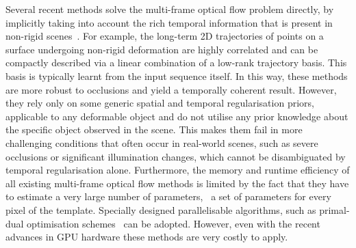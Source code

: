 Several recent methods solve the multi-frame optical flow problem directly, by 
implicitly taking into account the rich temporal information that is present in 
non-rigid scenes~\cite{irani2002multi,torresani2001tracking,torresani2002space,%
tomasi2012dense,ricco2013video,garg2013variational}. 
For example, the long-term 2D trajectories of points on a surface undergoing
non-rigid deformation are highly correlated and can be compactly described
via a linear combination of a low-rank trajectory basis. 
This basis is typically learnt from the input sequence itself. In 
this way, these methods are more robust to occlusions and yield a temporally coherent 
result. However, they rely only on some generic spatial and temporal regularisation 
priors, applicable to any deformable object and do not utilise any prior knowledge 
about the specific object observed in the scene. This makes them fail in more challenging 
conditions that often occur in real-world scenes, such as severe occlusions or 
significant illumination changes, which cannot be disambiguated by temporal
regularisation alone.
Furthermore, the memory and runtime efficiency of all existing multi-frame optical 
flow methods is limited by the fact that they have to estimate a very large number 
of parameters, \ie~a set of parameters for every pixel of the template.
Specially designed parallelisable algorithms, such as primal-dual optimisation
schemes~\cite{wedel2009improved,garg2013variational} 
can be adopted. However, even with the recent advances in GPU hardware these
methods are very costly to apply.

